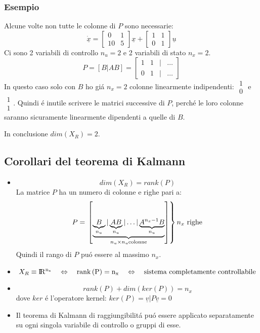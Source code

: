 \documentclass[../main.tex]{subfiles}
\begin{document}
	\subsubsection*{Esempio}
		Alcune volte non tutte le colonne di $ P $ sono necessarie:
		\[
			\underline{\dot x} =
			\begin{bmatrix}
				0 & 1\\
				10 & 5
			\end{bmatrix} \underline x +
			\begin{bmatrix}
				1 & 1\\
				0 & 1
			\end{bmatrix} \underline u
		\]
		Ci sono 2 variabili di controllo $ n_u = 2 $ e 2 variabili di stato $ n_x = 2 $.
		\[
			P = \left[ B | AB \right] =
			\begin{bmatrix}
				1 & 1 & | & \dots\\
				0 & 1 & | & \dots
			\end{bmatrix}
		 \]
		 In questo caso solo con $ B $ ho gi\'a $ n_x = 2 $ colonne linearmente indipendenti: $ \begin{smallmatrix}1\\ 0\end{smallmatrix} $ e $ \begin{smallmatrix}1\\ 1\end{smallmatrix} $. Quindi \'e inutile scrivere le matrici successive di $ P $, perch\'e le loro colonne saranno sicuramente linearmente dipendenti a quelle di $ B $.
		 
		 In conclusione $ dim\left( X_R \right) = 2 $.
		 
	\subsection{Corollari del teorema di Kalmann}
		\begin{itemize}
			\item 
				\[ dim\left( X_R \right) = rank\left( P \right) \]
				La matrice $ P $ ha un numero di colonne e righe pari a:
				\[ P = \left. \left[ \underbrace{\underbrace{B}_{n_u} | \underbrace{AB}_{n_u} | \dots | \underbrace{A^{n_x-1} B}_{n_u}}_{n_u \times n_u \text{colonne}} \right] \right\rbrace\text{$ n_x $ righe} \]
				Quindi il rango di $ P $ pu\'o essere al massimo $ n_x $.
			\item 
				\[ X_R \equiv \rm I\!R^{n_x} \quad\Leftrightarrow\quad rank\left( P \right) = n_x \quad\Leftrightarrow\quad \text{sistema completamente controllabile} \]
			\item 
				\[ rank\left( P \right) + dim\left( ker\left( P \right) \right) = n_x \]
				dove $ ker $ \'e l'operatore kernel: $ ker\left( P \right) = \underline v | P \underline v = 0 $
			\item 
				Il teorema di Kalmann di raggiungibilit\'a pu\'o essere applicato separatamente su ogni singola variabile di controllo o gruppi di esse.
		\end{itemize}
	
\end{document}
